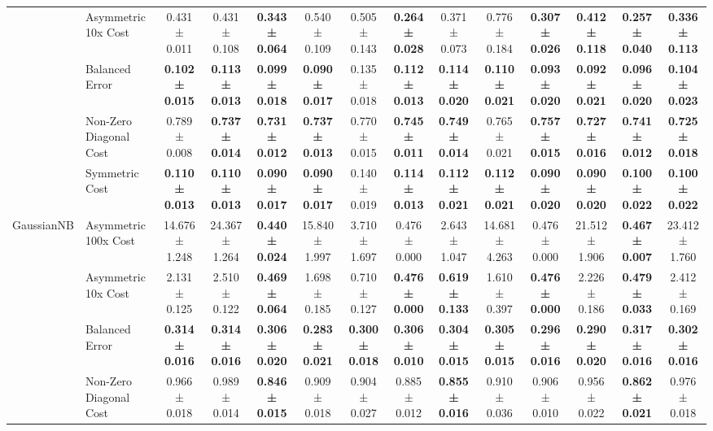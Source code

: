 \begin{table}[H]
{\begin{tabular}{llcccccccccccc}
 & Asymmetric 10x Cost & 0.431 ± 0.011 & 0.431 ± 0.108 & \textbf{0.343 ± 0.064} & 0.540 ± 0.109 & 0.505 ± 0.143 & \textbf{0.264 ± 0.028} & 0.371 ± 0.073 & 0.776 ± 0.184 & \textbf{0.307 ± 0.026} & \textbf{0.412 ± 0.118} & \textbf{0.257 ± 0.040} & \textbf{0.336 ± 0.113} \\
 & Balanced Error & \textbf{0.102 ± 0.015} & \textbf{0.113 ± 0.013} & \textbf{0.099 ± 0.018} & \textbf{0.090 ± 0.017} & 0.135 ± 0.018 & \textbf{0.112 ± 0.013} & \textbf{0.114 ± 0.020} & \textbf{0.110 ± 0.021} & \textbf{0.093 ± 0.020} & \textbf{0.092 ± 0.021} & \textbf{0.096 ± 0.020} & \textbf{0.104 ± 0.023} \\
 & Non-Zero Diagonal Cost & 0.789 ± 0.008 & \textbf{0.737 ± 0.014} & \textbf{0.731 ± 0.012} & \textbf{0.737 ± 0.013} & 0.770 ± 0.015 & \textbf{0.745 ± 0.011} & \textbf{0.749 ± 0.014} & 0.765 ± 0.021 & \textbf{0.757 ± 0.015} & \textbf{0.727 ± 0.016} & \textbf{0.741 ± 0.012} & \textbf{0.725 ± 0.018} \\
 & Symmetric Cost & \textbf{0.110 ± 0.013} & \textbf{0.110 ± 0.013} & \textbf{0.090 ± 0.017} & \textbf{0.090 ± 0.017} & 0.140 ± 0.019 & \textbf{0.114 ± 0.013} & \textbf{0.112 ± 0.021} & \textbf{0.112 ± 0.021} & \textbf{0.090 ± 0.020} & \textbf{0.090 ± 0.020} & \textbf{0.100 ± 0.022} & \textbf{0.100 ± 0.022} \\
\cline{1-14}
\multirow[t]{5}{*}{GaussianNB} & Asymmetric 100x Cost & 14.676 ± 1.248 & 24.367 ± 1.264 & \textbf{0.440 ± 0.024} & 15.840 ± 1.997 & 3.710 ± 1.697 & 0.476 ± 0.000 & 2.643 ± 1.047 & 14.681 ± 4.263 & 0.476 ± 0.000 & 21.512 ± 1.906 & \textbf{0.467 ± 0.007} & 23.412 ± 1.760 \\
 & Asymmetric 10x Cost & 2.131 ± 0.125 & 2.510 ± 0.122 & \textbf{0.469 ± 0.064} & 1.698 ± 0.185 & 0.710 ± 0.127 & \textbf{0.476 ± 0.000} & \textbf{0.619 ± 0.133} & 1.610 ± 0.397 & \textbf{0.476 ± 0.000} & 2.226 ± 0.186 & \textbf{0.479 ± 0.033} & 2.412 ± 0.169 \\
 & Balanced Error & \textbf{0.314 ± 0.016} & \textbf{0.314 ± 0.016} & \textbf{0.306 ± 0.020} & \textbf{0.283 ± 0.021} & \textbf{0.300 ± 0.018} & \textbf{0.306 ± 0.010} & \textbf{0.304 ± 0.015} & \textbf{0.305 ± 0.015} & \textbf{0.296 ± 0.016} & \textbf{0.290 ± 0.020} & \textbf{0.317 ± 0.016} & \textbf{0.302 ± 0.016} \\
 & Non-Zero Diagonal Cost & 0.966 ± 0.018 & 0.989 ± 0.014 & \textbf{0.846 ± 0.015} & 0.909 ± 0.018 & 0.904 ± 0.027 & 0.885 ± 0.012 & \textbf{0.855 ± 0.016} & 0.910 ± 0.036 & 0.906 ± 0.010 & 0.956 ± 0.022 & \textbf{0.862 ± 0.021} & 0.976 ± 0.018 \\

\end{tabular}}
\end{table}
